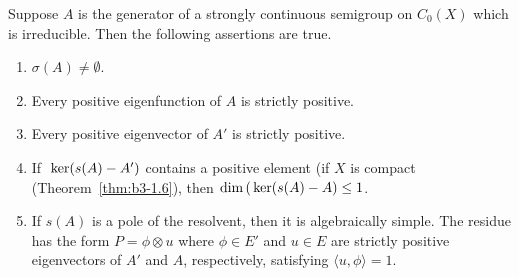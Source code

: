 \begin{proposition}\label{prop:b3-3.5}
	Suppose $A$ is the generator of a strongly continuous semigroup on $C_{0}(X)$ which is irreducible.
	Then the following assertions are true.
	\begin{enumerate}[\upshape (i)]
		\item 
		$\sigma(A) \neq \emptyset$.
		
		\item 
		Every positive eigenfunction of\/ $A$ is strictly positive.
		
		\item 
		Every positive eigenvector of\/ $A'$ is strictly positive.
		
		\item 
		If\ $\mathop{}\mathrm{ker}(s(A) - A')$ contains a positive element (\eg if\/ $X$ is compact (\cf Theorem~\ref{thm:b3-1.6}), then $\dim(\Kern{s(A) - A} \leq 1$.
		
		\item 
        
		If\/ $s(A)$ is a pole of the resolvent, then it is algebraically simple.
		The residue has the form $P = \phi \otimes u$ where $\phi \in E'$ and $u \in E$ are strictly positive eigenvectors of\/ $A'$ and $A$, respectively, satisfying $\langle u,\phi\rangle = 1$.
	\end{enumerate}
\end{proposition}
